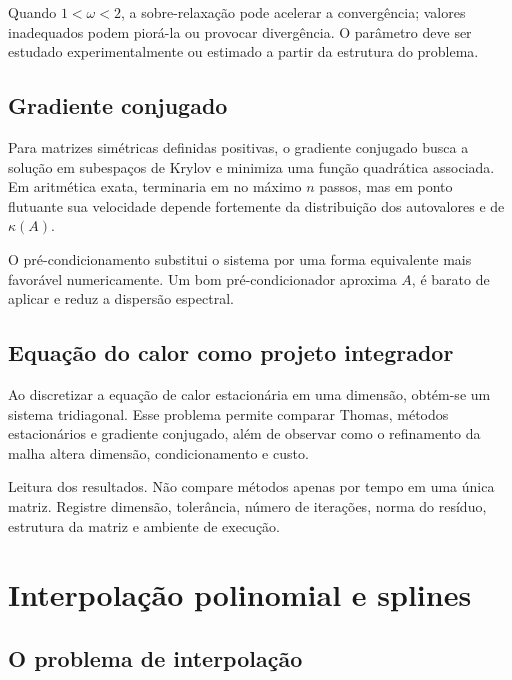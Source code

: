 \documentclass[12pt,a4paper,openany]{book}
\begin{document}
Quando $1<\omega<2$, a sobre-relaxação pode acelerar a convergência; valores inadequados podem piorá-la ou provocar divergência. O parâmetro deve ser estudado experimentalmente ou estimado a partir da estrutura do problema.



\section{Gradiente conjugado}



Para matrizes simétricas definidas positivas, o gradiente conjugado busca a solução em subespaços de Krylov e minimiza uma função quadrática associada. Em aritmética exata, terminaria em no máximo $n$ passos, mas em ponto flutuante sua velocidade depende fortemente da distribuição dos autovalores e de $\kappa(A)$.



O pré-condicionamento substitui o sistema por uma forma equivalente mais favorável numericamente. Um bom pré-condicionador aproxima $A$, é barato de aplicar e reduz a dispersão espectral.



\section{Equação do calor como projeto integrador}



Ao discretizar a equação de calor estacionária em uma dimensão, obtém-se um sistema tridiagonal. Esse problema permite comparar Thomas, métodos estacionários e gradiente conjugado, além de observar como o refinamento da malha altera dimensão, condicionamento e custo.



\begin{destaque}{Leitura dos resultados.}
Não compare métodos apenas por tempo em uma única matriz. Registre dimensão, tolerância, número de iterações, norma do resíduo, estrutura da matriz e ambiente de execução.
\end{destaque}



\chapter{Interpolação polinomial e splines}



\section{O problema de interpolação}
\end{document}
